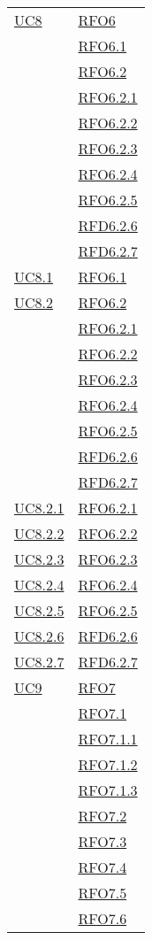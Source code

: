 \begin{longtable}{|>{\centering}m{5cm}|m{5cm}<{\centering}|}
\hyperlink{UC8}{UC8} & \hyperlink{RFO6}{RFO6}\\
& \hyperlink{RFO6.1}{RFO6.1}\\
& \hyperlink{RFO6.2}{RFO6.2}\\
& \hyperlink{RFO6.2.1}{RFO6.2.1}\\
& \hyperlink{RFO6.2.2}{RFO6.2.2}\\
& \hyperlink{RFO6.2.3}{RFO6.2.3}\\
& \hyperlink{RFO6.2.4}{RFO6.2.4}\\
& \hyperlink{RFO6.2.5}{RFO6.2.5}\\
& \hyperlink{RFD6.2.6}{RFD6.2.6}\\
& \hyperlink{RFD6.2.7}{RFD6.2.7}\\\hline

\hyperlink{UC8.1}{UC8.1} & \hyperlink{RFO6.1}{RFO6.1}\\\hline

\hyperlink{UC8.2}{UC8.2} & \hyperlink{RFO6.2}{RFO6.2}\\
& \hyperlink{RFO6.2.1}{RFO6.2.1}\\
& \hyperlink{RFO6.2.2}{RFO6.2.2}\\
& \hyperlink{RFO6.2.3}{RFO6.2.3}\\
& \hyperlink{RFO6.2.4}{RFO6.2.4}\\
& \hyperlink{RFO6.2.5}{RFO6.2.5}\\
& \hyperlink{RFD6.2.6}{RFD6.2.6}\\
& \hyperlink{RFD6.2.7}{RFD6.2.7}\\\hline

\hyperlink{UC8.2.1}{UC8.2.1} & \hyperlink{RFO6.2.1}{RFO6.2.1}\\\hline
\hyperlink{UC8.2.2}{UC8.2.2} & \hyperlink{RFO6.2.2}{RFO6.2.2}\\\hline
\hyperlink{UC8.2.3}{UC8.2.3} & \hyperlink{RFO6.2.3}{RFO6.2.3}\\\hline
\hyperlink{UC8.2.4}{UC8.2.4} & \hyperlink{RFO6.2.4}{RFO6.2.4}\\\hline
\hyperlink{UC8.2.5}{UC8.2.5} & \hyperlink{RFO6.2.5}{RFO6.2.5}\\\hline
\hyperlink{UC8.2.6}{UC8.2.6} & \hyperlink{RFD6.2.6}{RFD6.2.6}\\\hline
\hyperlink{UC8.2.7}{UC8.2.7} & \hyperlink{RFD6.2.7}{RFD6.2.7}\\\hline

\hyperlink{UC9}{UC9} & \hyperlink{RFO7}{RFO7}\\
& \hyperlink{RFO7.1}{RFO7.1}\\
& \hyperlink{RFO7.1.1}{RFO7.1.1}\\
& \hyperlink{RFO7.1.2}{RFO7.1.2}\\
& \hyperlink{RFO7.1.3}{RFO7.1.3}\\
& \hyperlink{RFO7.2}{RFO7.2}\\
& \hyperlink{RFO7.3}{RFO7.3}\\
& \hyperlink{RFO7.4}{RFO7.4}\\
& \hyperlink{RFO7.5}{RFO7.5}\\
& \hyperlink{RFO7.6}{RFO7.6}\\\hline


\end{longtable}

